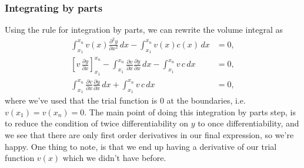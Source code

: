 \documentclass[acmtog]{acmart}
\begin{document}
\subsubsection{Integrating by parts}
Using the rule for integration by parts, we can rewrite the volume integral as
%
\begin{align}
  \int_{x_1}^{x_n} v(x)\frac{ \partial^{2} y }{ \partial x^{2} }\,dx - \int_{x_1}^{x_n} v(x) c(x) \, dx                                                                                         & = 0, \\
  \left[v \, \frac{ \partial y }{ \partial x } \right]_{x_1}^{x_n} - \int_{x_1}^{x_n} \frac{ \partial v }{ \partial x } \frac{ \partial y }{ \partial x } \, dx - \int_{x_1}^{x_n} v \, c \, dx & = 0, \\
  \int_{x_1}^{x_n} \frac{ \partial v }{ \partial x } \frac{ \partial y }{ \partial x } \, dx + \int_{x_1}^{x_n} v \, c \, dx                                                                    & = 0,
\end{align}
%
where we've used that the trial function is 0 at the boundaries, i.e. $v(x_1) =
  v(x_n) = 0$. The main point of doing this integration by parts step, is to
reduce the condition of twice differentiability on $y$ to once
differentiability, and we see that there are only first order derivatives in
our final expression, so we're happy. One thing to note, is that we end up
having a derivative of our trial function $v(x)$ which we didn't have before.
\end{document}
